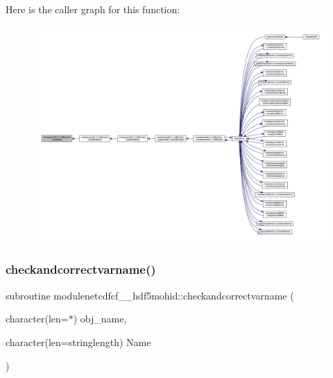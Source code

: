 Here is the caller graph for this function\+:\nopagebreak
\begin{figure}[H]
\begin{center}
\leavevmode
\includegraphics[width=350pt]{namespacemodulenetcdfcf__2__hdf5mohid_a8712e5cb09686b66d3aa9f8e05e3bd82_icgraph}
\end{center}
\end{figure}
\mbox{\label{namespacemodulenetcdfcf__2__hdf5mohid_ac0196286655bc4a08fbda809ca8d39e9}} 
\subsubsection{\texorpdfstring{checkandcorrectvarname()}{checkandcorrectvarname()}}
{\footnotesize\ttfamily subroutine modulenetcdfcf\+\_\+\_\+hdf5mohid\+::checkandcorrectvarname (\begin{DoxyParamCaption}\item[{character(len=$\ast$)}]{obj\+\_\+name,  }\item[{character(len=stringlength)}]{Name }\end{DoxyParamCaption})\hspace{0.3cm}{\ttfamily [private]}}

